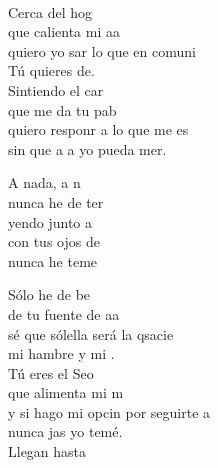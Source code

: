 \begin{cancion}%
	       \chord{(}{**)}{    }\\
	Cerca del hog  \\
	que calienta mi aa \\
	quiero yo sar lo que en comuni\\
	Tú quieres de.\\
	\jump
	Sintiendo el car \\
	que me da tu pab \\
	quiero responr a lo que me es\\
	sin que a a yo pueda mer.\jump\\
	\begin{chorus}%
		A nada, a n  \\
		nunca he de ter\\
		yendo junto a \\
		con tus ojos de \\
		nunca he  teme\jump\\
	\end{chorus}%
	Sólo he de be \\
	de tu fuente de aa \\
	sé que sólella será la qsacie\\
	mi hambre y mi .\\
	\jump
	Tú eres el Seo \\
	que alimenta mi m \\
	y si hago mi opcin por seguirte a\\
	nunca jas yo temé.\\
	\jump
	Llegan hasta   \\

\end{cancion}
